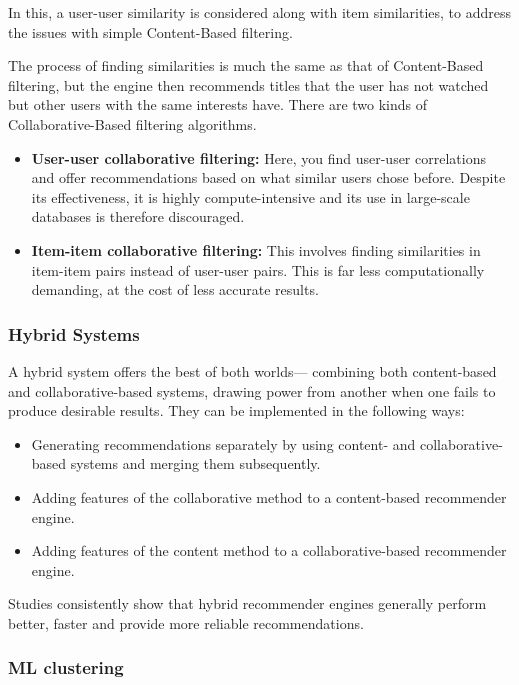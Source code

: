 \documentclass{article}
\begin{document}
In this, a user-user similarity is considered along with item similarities, to address the issues with simple Content-Based filtering.

\medskip

\noindent The process of finding similarities is much the same as that of Content-Based filtering, but the engine then recommends titles that the user has not watched but other users with the same interests have. There are two kinds of Collaborative-Based filtering algorithms.

\begin{itemize}
    \item{\textbf{User-user collaborative filtering:} Here, you find user-user correlations and offer recommendations based on what similar users chose before. Despite its effectiveness, it is highly compute-intensive and its use in large-scale databases is therefore discouraged.}
    \item{\textbf{Item-item collaborative filtering:} This involves finding similarities in item-item pairs instead of user-user pairs. This is far less computationally demanding, at the cost of less accurate results.}
\end{itemize}

\subsubsection{Hybrid Systems}

A hybrid system offers the best of both worlds— combining both content-based and collaborative-based systems, drawing power from another when one fails to produce desirable results. They can be implemented in the following ways:

\begin{itemize}
    \item{Generating recommendations separately by using content- and collaborative-based systems and merging them subsequently.}
    \item{Adding features of the collaborative method to a content-based recommender engine.}
    \item{Adding features of the content method to a collaborative-based recommender engine.}
\end{itemize}

\noindent Studies consistently show that hybrid recommender engines generally perform better, faster and provide more reliable recommendations.

\subsubsection{ML clustering}
\end{document}
